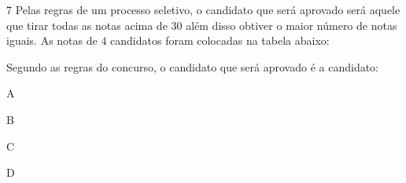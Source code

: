 
\num{7}  Pelas regras de um processo seletivo, o candidato que será aprovado
será aquele que tirar todas as notas acima de $30$ além disso obtiver o
maior número de notas iguais. As notas de $4$ candidatos foram colocadas
na tabela abaixo:


Segundo as regras do concurso, o candidato que será aprovado é a
candidato:

\begin{escolha}
\item A
\item B
\item C
\item D
\end{escolha}



